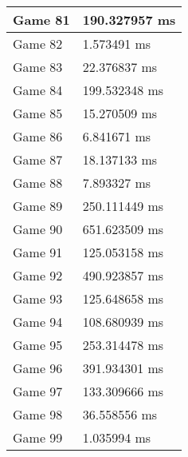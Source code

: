 \begin{tabular}{|l|l|}
	Game 81 & 190.327957 ms \\ \hline
	Game 82 & 1.573491 ms \\ \hline
	Game 83 & 22.376837 ms \\ \hline
	Game 84 & 199.532348 ms \\ \hline
	Game 85 & 15.270509 ms \\ \hline
	Game 86 & 6.841671 ms \\ \hline
	Game 87 & 18.137133 ms \\ \hline
	Game 88 & 7.893327 ms \\ \hline
	Game 89 & 250.111449 ms \\ \hline
	Game 90 & 651.623509 ms \\ \hline
	Game 91 & 125.053158 ms \\ \hline
	Game 92 & 490.923857 ms \\ \hline
	Game 93 & 125.648658 ms \\ \hline
	Game 94 & 108.680939 ms \\ \hline
	Game 95 & 253.314478 ms \\ \hline
	Game 96 & 391.934301 ms \\ \hline
	Game 97 & 133.309666 ms \\ \hline
	Game 98 & 36.558556 ms \\ \hline
	Game 99 & 1.035994 ms \\ \hline
\end{tabular}
